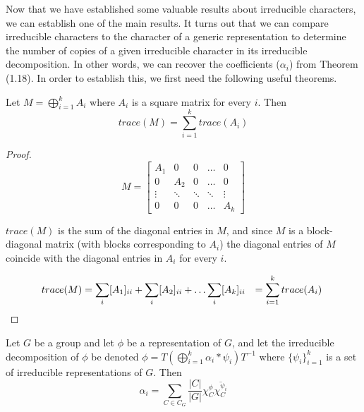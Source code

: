 Now that we have established some valuable results about irreducible characters, we can establish one of the main results. It turns out that we can compare irreducible characters to the character of a generic representation to determine the number of copies of a given irreducible character in its irreducible decomposition. In other words, we can recover the coefficients ($\alpha_i$) from Theorem (1.18). In order to establish this, we first need the following useful theorems.

\begin{theorem}
	Let $M = \bigoplus_{i=1}^k A_i$ where $A_i$ is a square matrix for every $i$. Then $$trace(M) = \sum_{i=1}^k trace(A_i)$$
\end{theorem} 

\noindent \begin{proof} $$M = \begin{bmatrix}
						A_1 & 0 & 0 & \hdots & 0 \\
						0 & A_2 & 0 & \hdots & 0 \\
						\vdots & \ddots & \ddots & \ddots & \vdots \\
						0 & 0 & 0 & \hdots & A_k
					\end{bmatrix}$$

$trace(M)$ is the sum of the diagonal entries in $M$, and since $M$ is a block-diagonal matrix (with blocks corresponding to $A_i$) the diagonal entries of $M$ coincide with the diagonal entries in $A_i$ for every $i$.

\begin{equation}
	\begin{aligned}
		trace(M) &= \sum_i [A_1]_{ii} + \sum_i [A_2]_{ii} + \hdots \sum_i [A_k]_{ii} &= \sum_{i=1}^k trace(A_i) \hspace{1mm}
	\end{aligned}
\end{equation}
\end{proof}

\begin{theorem}
	Let $G$ be a group and let $\phi$ be a representation of $G$, and let the irreducible decomposition of $\phi$ be denoted $\phi = T \left( \bigoplus_{i=1}^k \alpha_i *\psi_i\right) T^{-1}$ where $\{\psi_i\}_{i=1}^k$ is a set of irreducible representations of $G$. Then $$\alpha_i = \sum_{C\in C_G} \frac{|C|}{|G|}\chi^\phi_C \overline{\chi^{\psi_i}_C}$$
\end{theorem}

